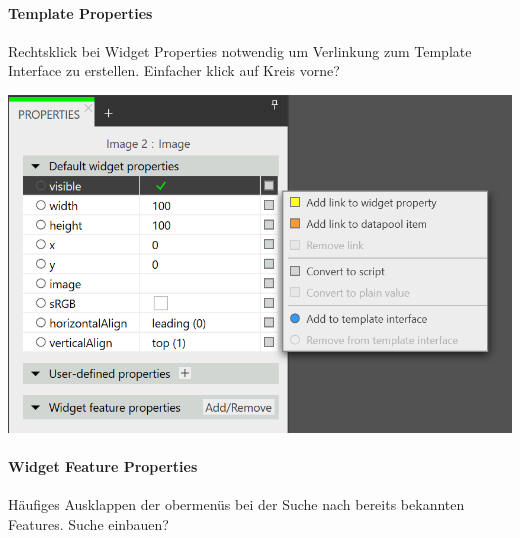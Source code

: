 \paragraph{Template Properties}
Rechtsklick bei Widget Properties notwendig um Verlinkung zum Template Interface zu erstellen. Einfacher klick auf Kreis vorne?

\begin{center}
  \includegraphics[scale=0.5]{figures/TemplateProperties.png}
  \label{fig:TemplateProperties}
\end{center}


\paragraph{Widget Feature Properties}
Häufiges Ausklappen der obermenüs bei der Suche nach bereits bekannten Features. Suche einbauen?

